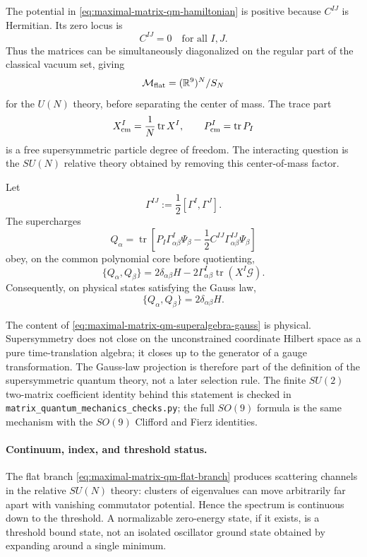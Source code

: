 The potential in \eqref{eq:maximal-matrix-qm-hamiltonian} is positive because
\(C^{IJ}\) is Hermitian.  Its zero locus is
\[
  C^{IJ}=0\quad\text{for all }I,J.
\]
Thus the matrices can be simultaneously diagonalized on the regular part of
the classical vacuum set, giving
\begin{equation}
  \mathcal M_{\rm flat}
  =
  (\mathbb R^9)^N/S_N
  \label{eq:maximal-matrix-qm-flat-branch}
\end{equation}
for the \(U(N)\) theory, before separating the center of mass.  The trace
part
\[
  X^I_{\rm cm}=\frac1N\operatorname{tr}X^I,
  \qquad
  P^I_{\rm cm}=\operatorname{tr}P_I
\]
is a free supersymmetric particle degree of freedom.  The interacting
question is the \(SU(N)\) relative theory obtained by removing this
center-of-mass factor.

\begin{proposition}
\label{prop:maximal-matrix-qm-superalgebra-gauss}
Let
\[
  \Gamma^{IJ}:=\frac12[\Gamma^I,\Gamma^J].
\]
The supercharges
\begin{equation}
  Q_\alpha
  =
  \operatorname{tr}\left[
    P_I\Gamma^I_{\alpha\beta}\Psi_\beta
    -\frac12 C^{IJ}\Gamma^{IJ}_{\alpha\beta}\Psi_\beta
  \right]
  \label{eq:maximal-matrix-qm-supercharge}
\end{equation}
obey, on the common polynomial core before quotienting,
\begin{equation}
  \{Q_\alpha,Q_\beta\}
  =
  2\delta_{\alpha\beta}H
  -2\Gamma^I_{\alpha\beta}\operatorname{tr}(X^I\mathcal G).
  \label{eq:maximal-matrix-qm-superalgebra-gauss}
\end{equation}
Consequently, on physical states satisfying the Gauss law,
\[
  \{Q_\alpha,Q_\beta\}=2\delta_{\alpha\beta}H .
\]
\end{proposition}

The content of
\eqref{eq:maximal-matrix-qm-superalgebra-gauss} is physical.  Supersymmetry
does not close on the unconstrained coordinate Hilbert space as a pure
time-translation algebra; it closes up to the generator of a gauge
transformation.  The Gauss-law projection is therefore part of the definition
of the supersymmetric quantum theory, not a later selection rule.  The finite
\(SU(2)\) two-matrix coefficient identity behind this statement is checked in
\texttt{matrix\_quantum\_mechanics\_checks.py}; the full \(SO(9)\) formula is the same
mechanism with the \(SO(9)\) Clifford and Fierz identities.

\paragraph{Continuum, index, and threshold status.}
The flat branch \eqref{eq:maximal-matrix-qm-flat-branch} produces scattering
channels in the relative \(SU(N)\) theory: clusters of eigenvalues can move
arbitrarily far apart with vanishing commutator potential.  Hence the
spectrum is continuous down to the threshold.  A normalizable zero-energy
state, if it exists, is a threshold bound state, not an isolated oscillator
ground state obtained by expanding around a single minimum.

